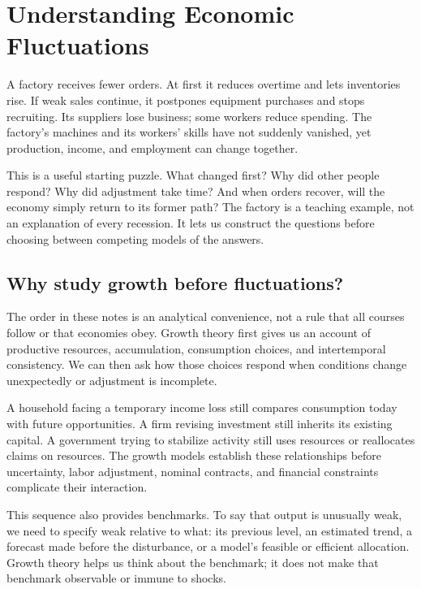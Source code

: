 \section{Understanding Economic Fluctuations}\label{sec:fluctuations-intuition}

A factory receives fewer orders. At first it reduces overtime and lets
inventories rise. If weak sales continue, it postpones equipment purchases
and stops recruiting. Its suppliers lose business; some workers reduce
spending. The factory's machines and its workers' skills have not suddenly
vanished, yet production, income, and employment can change together.

This is a useful starting puzzle. What changed first? Why did other people
respond? Why did adjustment take time? And when orders recover, will the
economy simply return to its former path? The factory is a teaching example,
not an explanation of every recession. It lets us construct the questions
before choosing between competing models of the answers.

\subsection{Why study growth before fluctuations?}

The order in these notes is an analytical convenience, not a rule that
all courses follow or that economies obey. Growth theory first gives us
an account of productive resources, accumulation, consumption choices,
and intertemporal consistency. We can then ask how those choices respond
when conditions change unexpectedly or adjustment is incomplete.

A household facing a temporary income loss still compares consumption
today with future opportunities. A firm revising investment still inherits
its existing capital. A government trying to stabilize activity still
uses resources or reallocates claims on resources. The growth models
establish these relationships before uncertainty, labor adjustment, nominal
contracts, and financial constraints complicate their interaction.

This sequence also provides benchmarks. To say that output is unusually
weak, we need to specify weak relative to what: its previous level, an
estimated trend, a forecast made before the disturbance, or a model's
feasible or efficient allocation. Growth theory helps us think about the
benchmark; it does not make that benchmark observable or immune to shocks.

